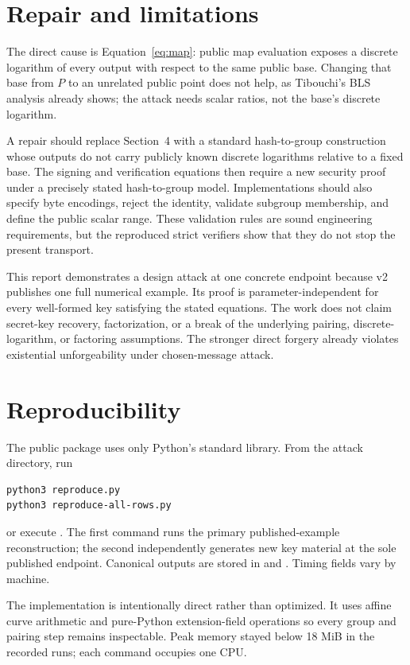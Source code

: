 \documentclass[10pt,a4paper]{article}
\begin{document}
\section{Repair and limitations}

The direct cause is Equation~\eqref{eq:map}: public map evaluation exposes a
discrete logarithm of every output with respect to the same public base.
Changing that base from $P$ to an unrelated public point does not help, as
Tibouchi's BLS analysis already shows; the attack needs scalar ratios, not the
base's discrete logarithm.

A repair should replace Section~4 with a standard hash-to-group construction
whose outputs do not carry publicly known discrete logarithms relative to a
fixed base.  The signing and verification equations then require a new
security proof under a precisely stated hash-to-group model.  Implementations
should also specify byte encodings, reject the identity, validate subgroup
membership, and define the public scalar range.  These validation rules are
sound engineering requirements, but the reproduced strict verifiers show
that they do not stop the present transport.

This report demonstrates a design attack at one concrete endpoint because v2
publishes one full numerical example.  Its proof is parameter-independent for
every well-formed key satisfying the stated equations.  The work does not
claim secret-key recovery, factorization, or a break of the underlying
pairing, discrete-logarithm, or factoring assumptions.  The stronger direct
forgery already violates existential unforgeability under chosen-message
attack.

\section{Reproducibility}

The public package uses only Python's standard library.  From the attack
directory, run
\begin{verbatim}
python3 reproduce.py
python3 reproduce-all-rows.py
\end{verbatim}
or execute .  The first command runs the primary
published-example reconstruction; the second independently generates new key
material at the sole published endpoint.  Canonical outputs are stored in
 and
.  Timing fields vary by machine.

The implementation is intentionally direct rather than optimized.  It uses
affine curve arithmetic and pure-Python extension-field operations so every
group and pairing step remains inspectable.  Peak memory stayed below 18 MiB
in the recorded runs; each command occupies one CPU.
\end{document}
